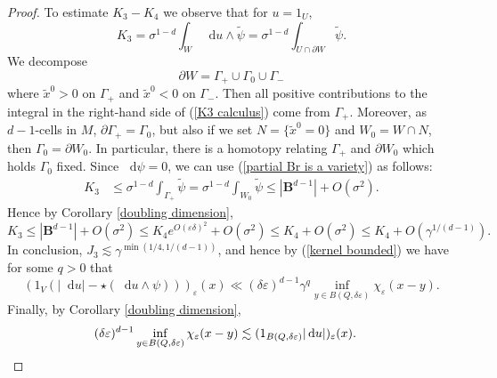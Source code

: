 \documentclass[reqno,11pt]{amsart}
\newcommand{\Ball}{\mathbf{B}}
\newcommand*\dif{\mathop{}\!\mathrm{d}}
\theoremstyle{definition}
\numberwithin{equation}{section}
\begin{document}
\begin{proof}
To estimate $K_3 - K_4$ we observe that for $u = 1_U$,
\begin{equation}\label{K3 calculus}
K_3 = \sigma^{1 - d} \int_W \dif u \wedge \tilde \psi = \sigma^{1 - d} \int_{U \cap \partial W} \tilde \psi.
\end{equation}
We decompose
$$\partial W = \Gamma_+ \cup \Gamma_0 \cup \Gamma_-$$
where $\tilde x^0 > 0$ on $\Gamma_+$ and $\tilde x^0 < 0$ on $\Gamma_-$. Then all positive contributions to the integral in the right-hand side of (\ref{K3 calculus}) come from $\Gamma_+$.
Moreover, as $d-1$-cells in $M$, $\partial \Gamma_+ = \Gamma_0$, but also if we set $N = \{\tilde x^0 = 0\}$ and $W_0 = W \cap N$, then $\Gamma_0 = \partial W_0$.
In particular, there is a homotopy relating $\Gamma_+$ and $\partial W_0$ which holds $\Gamma_0$ fixed.
Since $\dif \psi = 0$, we can use (\ref{partial Br is a variety}) as follows:
\begin{align*}
K_3 &\leq \sigma^{1 - d} \int_{\Gamma_+} \tilde \psi = \sigma^{1 - d} \int_{W_0} \tilde \psi \leq |\Ball^{d - 1}| + O(\sigma^2).
\end{align*}
Hence by Corollary \ref{doubling dimension},
$$K_3 \leq |\Ball^{d - 1}| + O(\sigma^2) \leq K_4 e^{O(\varepsilon\delta)^2} + O(\sigma^2) \leq K_4 + O(\sigma^2) \leq K_4 + O(\gamma^{1/(d - 1)}).$$
In conclusion, $J_3 \lesssim \gamma^{\min(1/4, 1/(d - 1))}$, and hence by (\ref{kernel bounded}) we have for some $q > 0$ that
$$(1_V(|\dif u| - \star(\dif u \wedge \psi)))_\varepsilon(x) \ll (\delta\varepsilon)^{d - 1} \gamma^q \inf_{y \in B(Q, \delta\varepsilon)} \chi_\varepsilon(x - y).$$
Finally, by Corollary \ref{doubling dimension},
\begin{align*}
(\delta\varepsilon)^{d - 1} \inf_{y \in B(Q, \delta\varepsilon)} \chi_\varepsilon(x - y) &\lesssim (1_{B(Q, \delta\varepsilon)} |\dif u|)_\varepsilon(x). \qedhere
\end{align*}
\end{proof}
\end{document}
